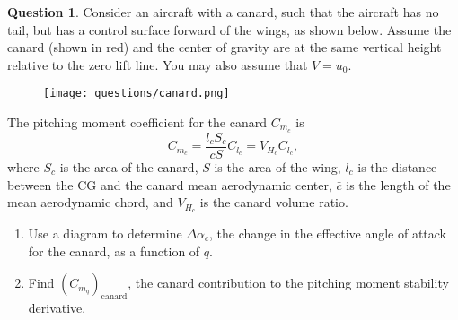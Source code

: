 \documentclass{article}
\theoremstyle{definition}
\newtheorem{question}{Question}
\begin{document}
\vspace{0.1cm}

\clearpage

\begin{question}
    Consider an aircraft with a canard, such that the aircraft has no tail, but has a control surface forward of the wings, as shown below. Assume the canard (shown in red) and the center of gravity are at the same vertical height relative to the zero lift line. You may also assume that $V=u_0$.

    \begin{figure}[h]
        \centering
        \texttt{[image: questions/canard.png]}
        \label{fig:canard}
    \end{figure}

    The pitching moment coefficient for the canard $C_{m_c}$ is
    \begin{equation*}
        C_{m_c} = \frac{l_cS_c}{\bar{c}S}C_{l_c}=V_{H_c}C_{l_c},
    \end{equation*}
    where $S_c$ is the area of the canard, $S$ is the area of the wing, $l_c$ is the distance between the CG and the canard mean aerodynamic center, $\bar{c}$ is the length of the mean aerodynamic chord, and $V_{H_c}$ is the canard volume ratio.

\begin{enumerate}
    \item Use a diagram to determine $\Delta \alpha_c$, the change in the effective angle of attack for the canard, as a function of $q$.
    \item Find $(C_{m_q})_{\text{canard}}$, the canard contribution to the pitching moment stability derivative.
\end{enumerate}

\end{question}

\vspace{0.1cm}
\end{document}
